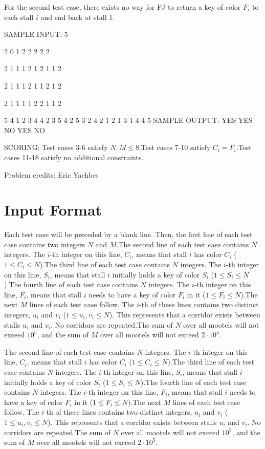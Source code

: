 \documentclass[12pt]{article}
\begin{document}
For the second test case, there exists no way for FJ to return a key of color
$F_i$ to each stall $i$ and end back at stall $1$.

SAMPLE INPUT:
5

2 0
1 2
2 2
2 2

2 1
1 1
2 1
2 1
1 2

2 1
1 1
2 1
1 2
1 2

2 1
1 1
1 2
2 1
1 2

5 4
1 2 3 4 4
2 3 5 4 2
5 3 2 4 2
1 2
1 3
1 4
4 5
SAMPLE OUTPUT: 
YES
YES
NO
YES
NO

SCORING:
Test cases 3-6 satisfy $N,M\le 8$.Test cases 7-10 satisfy $C_i=F_i$.Test cases 11-18 satisfy no additional constraints.


Problem credits: Eric Yachbes



\section*{Input Format}
Each test case will be preceded by a blank line. Then, the first line 
of each test case contains two integers $N$ and $M$.The second line of each test case contains $N$ integers. The $i$-th integer on
this line, $C_i$, means that stall $i$ has color $C_i$ ($1 \le C_i \le N$).The third line of each test case contains $N$ integers. The $i$-th integer on
this line, $S_i$, means that stall $i$ initially holds a key of color $S_i$
($1 \le S_i \le N$).The fourth line of each test case contains $N$ integers. The $i$-th integer on
this line, $F_i$, means that stall $i$ needs to have a key of color $F_i$ in it
($1 \le F_i \le N$).The next $M$ lines of each test case follow. The $i$-th of these lines contains
two distinct integers, $u_i$ and $v_i$ ($1 \le u_i, v_i \le N$). This represents
that a corridor exists between stalls $u_i$ and $v_i$. No corridors are
repeated.The sum of $N$ over all mootels will not exceed $10^5$, and the sum of $M$ over
all mootels will not exceed $2\cdot 10^5$.

The second line of each test case contains $N$ integers. The $i$-th integer on
this line, $C_i$, means that stall $i$ has color $C_i$ ($1 \le C_i \le N$).The third line of each test case contains $N$ integers. The $i$-th integer on
this line, $S_i$, means that stall $i$ initially holds a key of color $S_i$
($1 \le S_i \le N$).The fourth line of each test case contains $N$ integers. The $i$-th integer on
this line, $F_i$, means that stall $i$ needs to have a key of color $F_i$ in it
($1 \le F_i \le N$).The next $M$ lines of each test case follow. The $i$-th of these lines contains
two distinct integers, $u_i$ and $v_i$ ($1 \le u_i, v_i \le N$). This represents
that a corridor exists between stalls $u_i$ and $v_i$. No corridors are
repeated.The sum of $N$ over all mootels will not exceed $10^5$, and the sum of $M$ over
all mootels will not exceed $2\cdot 10^5$.
\end{document}
